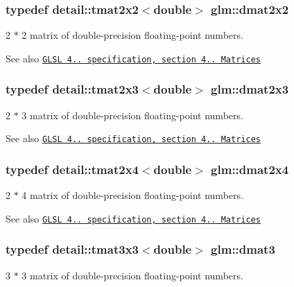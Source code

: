 \subsubsection[{dmat2x2}]{\setlength{\rightskip}{0pt plus 5cm}typedef detail\+::tmat2x2$<$double$>$ {\bf glm\+::dmat2x2}}\label{group__core__types_ga2c1de969d1d8cfcb297dbfa476b33dc8}
2 $\ast$ 2 matrix of double-\/precision floating-\/point numbers.

\begin{DoxySeeAlso}{See also}
\href{http://www.opengl.org/registry/doc/GLSLangSpec.4.20.8.pdf}{\tt G\+L\+S\+L 4.. specification, section 4.. Matrices} 
\end{DoxySeeAlso}
\hypertarget{group__core__types_gadba2f0efb492f511466de9784b0e07cd}{}
\subsubsection[{dmat2x3}]{\setlength{\rightskip}{0pt plus 5cm}typedef detail\+::tmat2x3$<$double$>$ {\bf glm\+::dmat2x3}}\label{group__core__types_gadba2f0efb492f511466de9784b0e07cd}
2 $\ast$ 3 matrix of double-\/precision floating-\/point numbers.

\begin{DoxySeeAlso}{See also}
\href{http://www.opengl.org/registry/doc/GLSLangSpec.4.20.8.pdf}{\tt G\+L\+S\+L 4.. specification, section 4.. Matrices} 
\end{DoxySeeAlso}
\hypertarget{group__core__types_gaa97c63383e2dc472510d77409a7d5001}{}
\subsubsection[{dmat2x4}]{\setlength{\rightskip}{0pt plus 5cm}typedef detail\+::tmat2x4$<$double$>$ {\bf glm\+::dmat2x4}}\label{group__core__types_gaa97c63383e2dc472510d77409a7d5001}
2 $\ast$ 4 matrix of double-\/precision floating-\/point numbers.

\begin{DoxySeeAlso}{See also}
\href{http://www.opengl.org/registry/doc/GLSLangSpec.4.20.8.pdf}{\tt G\+L\+S\+L 4.. specification, section 4.. Matrices} 
\end{DoxySeeAlso}
\hypertarget{group__core__types_ga557f8357220829c6a6a3e28640e33507}{}
\subsubsection[{dmat3}]{\setlength{\rightskip}{0pt plus 5cm}typedef detail\+::tmat3x3$<$double$>$ {\bf glm\+::dmat3}}\label{group__core__types_ga557f8357220829c6a6a3e28640e33507}
3 $\ast$ 3 matrix of double-\/precision floating-\/point numbers.

